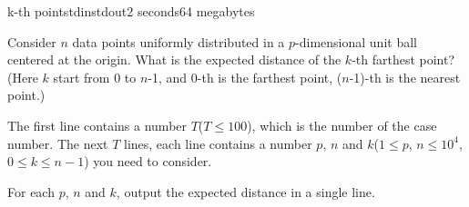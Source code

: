 \begin{problem}{k-th point}{stdin}{stdout}{2 seconds}{64 megabytes}

Consider $n$ data points uniformly distributed in a $p$-dimensional unit ball centered at the origin. What is the expected distance of the $k$-th farthest point? (Here $k$ start from 0 to $n$-1, and 0-th is the farthest point, ($n$-1)-th is the nearest point.)

\InputFile
The first line contains a number $T$($T \leq 100$), which is the number of the case number.
The next $T$ lines, each line contains a number $p$, $n$ and $k$($1\leq p$, $n \leq 10^4$,$0 \leq k \leq n-1$) you need to consider.

\OutputFile
For each $p$, $n$ and $k$, output the expected distance in a single line.

\Examples

\begin{example}
%
\end{example}

\end{problem}
